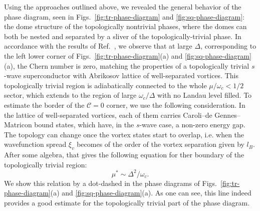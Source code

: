 \documentclass[10pt,prb,aps,superscriptaddress,amsmath,amssymb,twocolumn,floatfix,longbibliography]{revtex4-1}
\newcommand{\be}{\begin{equation} }
\newcommand{\ee}{\end{equation}}
\begin{document}
Using the approaches outlined above, we revealed the general behavior of the phase diagram, seen in Figs.~\ref{fig:tr-phase-diagram} and \ref{fig:sq-phase-diagram}: the dome structure of the topologically nontrivial phases, where the domes can both be nested and separated by a sliver of the topologically-trivial phase. In accordance with the results of Ref.~, we observe that at large $\Delta$, corresponding to the left lower corner of Figs.~\ref{fig:tr-phase-diagram}(a) and \ref{fig:sq-phase-diagram}(a), the Chern number is zero, matching the properties of a topologically trivial $s$-wave superconductor with Abrikosov lattice of well-separated vortices. This topologically trivial region is adiabatically connected to the whole $\mu / \omega_c < 1/2$ sector, which extends to the region of large $\omega_c / \Delta$ with no Landau level filled. To estimate the border of the $\mathcal{C} = 0$ corner, we use the following consideration. In the lattice of well-separated vortices, each of them carries Caroli--de Gennes--Matricon bound states, which  have, in the $s$-wave case, a non-zero energy gap. The topology can change once the vortex states start to overlap, i.e. when the wavefunction spread $\xi_v$ becomes of the order of the vortex separation given by $l_B$. After some algebra, that gives the following equation for ther boundary of the topologically trivial region:
\be \label{top-trivial-boundary}
    \mu^* \sim \Delta^2 / \omega_c.
\ee
We show this relation by a dot-dashed in the phase diagrams of Figs.~\ref{fig:tr-phase-diagram}(a) and \ref{fig:sq-phase-diagram}(a). As one can see, this line indeed provides a good estimate for the topologically trivial part of the phase diagram. 
 
\end{document}
